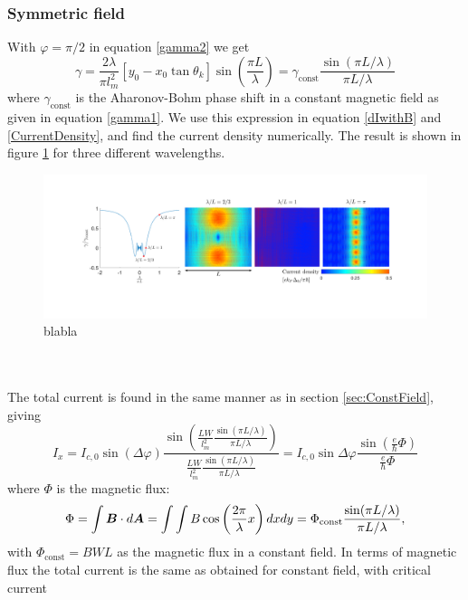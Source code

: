 \subsubsection{Symmetric field}
With $\varphi = \pi/2$ in equation \eqref{gamma2} we get
\begin{equation}
\gamma= \frac{2\lambda}{\pi l_m^2}\left[y_0 - x_0\tan\theta_k\right]\sin\left(\frac{\pi L}{\lambda}\right) = \gamma_{\mathrm{const}}\frac{\sin\left(\pi L/\lambda\right)}{\pi L/\lambda}
\end{equation}
where $\gamma_{\mathrm{const}}$ is the Aharonov-Bohm phase shift in a constant magnetic field as given in equation \eqref{gamma1}. We use this expression in equation \eqref{dIwithB} and \eqref{CurrentDensity}, and find the current density numerically. The result is shown in figure \ref{fig:Dist2} for three different wavelengths. 
\begin{figure}[hhh]
\centering
\includegraphics[width=17cm,clip=true,trim=5cm 4.5cm 4.4cm 3cm]{fig/dist3_pi-2}
\caption{blabla}
\label{fig:Dist2}
\end{figure}
\\
\\
The total current is found in the same manner as in section  \ref{sec:ConstField}, giving
\begin{equation}
I_x = I_{c,0}\sin(\Delta \varphi)\frac{\sin\left(\frac{LW}{l_m^2}\frac{\sin(\pi L/\lambda)}{\pi L/\lambda}\right)}{\frac{LW}{l_m^2}\frac{\sin(\pi L/\lambda)}{\pi L/\lambda}} = I_{c,0}\sin\Delta\varphi\frac{\sin(\frac{e}{\hbar}\Phi)}{\frac{e}{\hbar}\Phi}
\end{equation}
where $\Phi$ is the magnetic flux:
\begin{equation}
    \Phi = \int \boldsymbol{B}\cdot d\boldsymbol{A} = \int \int B\cos\left(\frac{2\pi}{\lambda}x\right)dxdy = \Phi_{\mathrm{const}}\frac{\sin(\pi L/\lambda)}{\pi L/\lambda},
\end{equation}
with $\Phi_{\mathrm{const}} = BWL$ as the magnetic flux in a constant field. In terms of magnetic flux the total current is the same as obtained for constant field, with critical current
